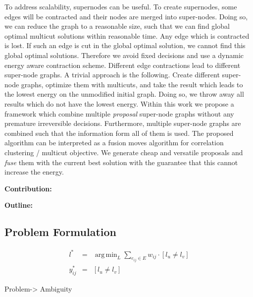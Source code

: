 \documentclass[10pt,twocolumn,letterpaper]{article}
\DeclareMathOperator*{\argmin}{arg\,min}
\begin{document}
To address scalability, supernodes can be useful.
To create supernodes, some edges will be contracted
and their nodes are merged into super-nodes.
Doing so, we can reduce  the graph 
to a reasonable size, such that we can find
global optimal multicut solutions within reasonable time.
%
Any edge which is contracted is lost.
If such an edge is cut in the global optimal solution, we cannot 
find this global optimal solutions.
Therefore we avoid fixed decisions and use a
dynamic energy aware contraction scheme.
%
Different edge contractions lead to different super-node graphs.
A trivial approach is the following.
Create different super-node graphs, optimize them with multicuts,
and take the result which leads to the lowest energy
on the unmodified initial graph.
% 
Doing so, we throw away all results which do not have the lowest energy.
Within this work we propose a framework which 
combine multiple \emph{proposal} super-node graphs
without any premature irreversible decisions.
Furthermore, multiple super-node graphs are combined such
that the information form all of them is used.
%
The proposed algorithm can be interpreted as a fusion moves
algorithm for correlation clustering / multicut objective.
We generate cheap and versatile proposals
and \emph{fuse} them with the current best solution with the
guarantee that this cannot increase the energy.


\textbf{Contribution:}

\textbf{Outline:}


\subsection{Problem Formulation}
\begin{center}
    \begin{eqnarray}
        l^* &=& \argmin_{L} \sum_{ e_{ij} \in E } w_{ij} \cdot [l_{u} \neq l_{v}] \\
        y_{ij}^* &=& [l_{u} \neq l_{v}]  
    \end{eqnarray}
\end{center}

Problem-> Ambiguity

\end{document}
